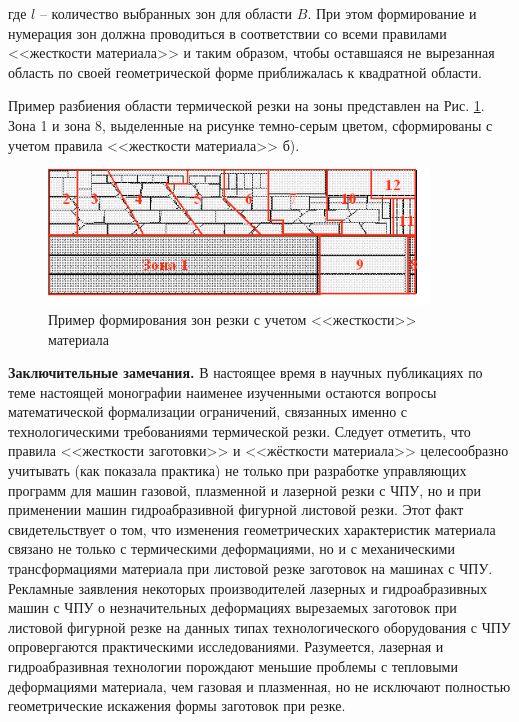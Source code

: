 \documentclass[11pt,twoside]{report}
\begin{document}
где $l$
– количество выбранных зон для области $B$.
При этом формирование и нумерация зон
должна проводиться в соответствии со всеми правилами
<<жесткости материала>> и таким образом,
чтобы оставшаяся не вырезанная область
по своей геометрической форме приближалась к квадратной области.

Пример разбиения области термической резки на зоны
представлен на
Рис. \ref{zones}.
Зона 1 и зона 8,
выделенные на рисунке темно-серым цветом,
сформированы с учетом правила <<жесткости материала>> б).

\begin{figure}
  \begin{center}
  \includegraphics[width=0.9\textwidth]{zones.png}
  \caption{Пример формирования зон резки с учетом <<жесткости>> материала}
  \label{zones}
  \end{center}
\end{figure}

{\bf Заключительные замечания.}
В настоящее время в научных публикациях по теме настоящей монографии
наименее изученными остаются вопросы математической формализации ограничений,
связанных именно с технологическими требованиями термической резки.
Следует отметить, что правила <<жесткости заготовки>> и <<жёсткости материала>>
целесообразно учитывать (как показала практика)
не только при разработке управляющих программ для машин газовой,
плазменной и лазерной резки с ЧПУ,
но и при применении машин гидроабразивной фигурной листовой резки.
Этот факт свидетельствует о том,
что изменения геометрических характеристик материала
связано не только с термическими деформациями,
но и с механическими трансформациями материала
при листовой резке заготовок на машинах с ЧПУ.
Рекламные заявления некоторых производителей
лазерных и гидроабразивных машин с ЧПУ о незначительных
деформациях вырезаемых заготовок при листовой фигурной
резке на данных типах технологического оборудования с ЧПУ
опровергаются практическими исследованиями.
Разумеется, лазерная и гидроабразивная технологии
порождают меньшие проблемы с тепловыми деформациями материала,
чем газовая и плазменная,
но не исключают полностью геометрические искажения формы заготовок при резке.
\end{document}

